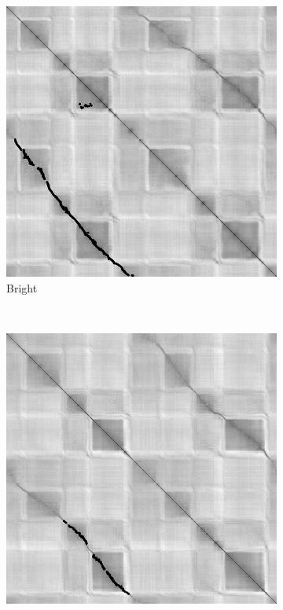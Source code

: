 \documentclass[]{spie}  %
\begin{document}
\begin{figure}
        \centering
        
        \begin{subfigure}[b]{0.30\textwidth}
        \centering
        \includegraphics[trim = 0mm 0mm 0mm 0mm, clip, width=\textwidth]{figures/dist_bright.png}    
        \caption{Bright}
        \label{subfig:dist_bright}
        \end{subfigure}
        ~ 
        \begin{subfigure}[b]{0.30\textwidth}
        \centering
        \includegraphics[trim = 0mm 0mm 0mm 0mm, clip, width=\textwidth]{figures/dist_dim.png}    

\end{subfigure}
\end{figure}
\end{document}
